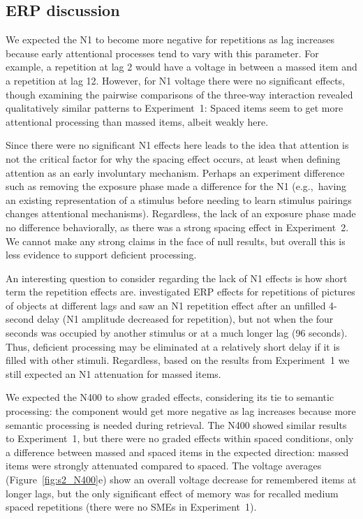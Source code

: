 \subsection{ERP discussion}

We expected the N1 to become more negative for repetitions as lag increases because early attentional processes tend to vary with this parameter.  For example, a repetition at lag 2 would have a voltage in between a massed item and a repetition at lag 12.  However, for N1 voltage there were no significant effects, though examining the pairwise comparisons of the three-way interaction revealed qualitatively similar patterns to Experiment~1:  Spaced items seem to get more attentional processing than massed items, albeit weakly here.

Since there were no significant N1 effects here leads to the idea that attention is not the critical factor for why the spacing effect occurs, at least when defining attention as an early involuntary mechanism.  Perhaps an experiment difference such as removing the exposure phase made a difference for the N1 (e.g.,~having an existing representation of a stimulus before needing to learn stimulus pairings changes attentional mechanisms).  Regardless, the lack of an exposure phase made no difference behaviorally, as there was a strong spacing effect in Experiment~2.  We cannot make any strong claims in the face of null results, but overall this is less evidence to support deficient processing.

An interesting question to consider regarding the lack of N1 effects is how short term the repetition effects are.   investigated ERP effects for repetitions of pictures of objects at different lags and saw an N1 repetition effect after an unfilled 4-second delay (N1 amplitude decreased for repetition), but not when the four seconds was occupied by another stimulus or at a much longer lag (96 seconds).  Thus, deficient processing may be eliminated at a relatively short delay if it is filled with other stimuli.  Regardless, based on the results from Experiment~1 we still expected an N1 attenuation for massed items.


We expected the N400 to show graded effects, considering its tie to  semantic processing: the component would get more negative as lag increases because more semantic processing is needed during retrieval.  The N400 showed similar results to Experiment~1, but there were no graded effects within spaced conditions, only a difference between massed and spaced items in the expected direction: massed items were strongly attenuated compared to spaced.  The voltage averages (Figure~\ref{fig:s2_N400}e) show an overall voltage decrease for remembered items at longer lags, but the only significant effect of memory was for recalled medium spaced repetitions (there were no SMEs in Experiment~1).

